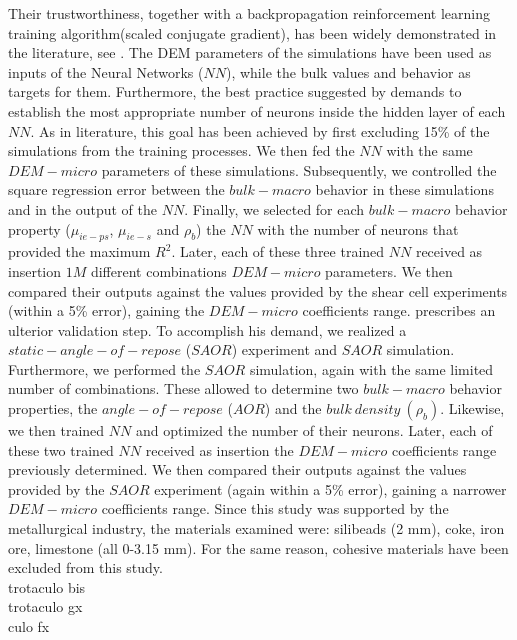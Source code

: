 Their trustworthiness, together with a backpropagation reinforcement learning training algorithm(scaled conjugate gradient), has been widely demonstrated in the literature, see \citet{RefWorks:158}.
The DEM parameters of the simulations have been used as inputs of the Neural Networks ($NN$), while the bulk values and behavior as targets for them.
Furthermore, the best practice suggested by \citet{RefWorks:150} demands to establish the most appropriate number of neurons inside the hidden layer of each $NN$.
As in literature, this goal has been achieved by first excluding 15\% of the simulations from the training processes.
We then fed the $NN$ with the same $DEM-micro$ parameters of these simulations.
Subsequently, we controlled the square regression error between the $bulk-macro$ behavior in these simulations and in the output of the $NN$.
Finally, we selected for each $bulk-macro$ behavior property ($\mu_{ie-ps}$, $\mu_{ie-s}$ and $\rho_b$) the $NN$ with the number of neurons that provided the maximum $R^2$.
Later, each of these three trained $NN$ received as insertion $1M$ different combinations $DEM-micro$ parameters.
We then compared their outputs against the values provided by the shear cell experiments (within a 5\% error), gaining the $DEM-micro$ coefficients range.
\citet{RefWorks:160} prescribes an ulterior validation step.
To accomplish his demand, we realized a $static-angle-of-repose$ ($SAOR$) experiment and $SAOR$ simulation.
Furthermore, we performed the $SAOR$ simulation, again with the same limited number of combinations.
These allowed to determine two $bulk-macro$ behavior properties, the $angle-of-repose$ ($AOR$) and the $bulk ~ density ~ (\rho_b)$.
Likewise, we then trained $NN$ and optimized the number of their neurons.
Later, each of these two trained $NN$ received as insertion the $DEM-micro$ coefficients range previously determined.
We then compared their outputs against the values provided by the $SAOR$ experiment (again within a 5\% error), gaining a narrower $DEM-micro$ coefficients range.
Since this study was supported by the metallurgical industry, the materials examined were: silibeads (2 mm), coke, iron ore, limestone (all 0-3.15 mm).
For the same reason, cohesive materials have been excluded from this study.\\ \label{par:materials}
trotaculo bis \\
trotaculo gx \\
culo fx